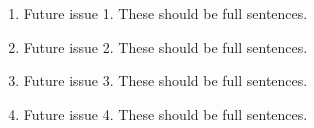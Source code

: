\documentclass{ar-1col}
\begin{document}
\begin{issues}
  \begin{enumerate}
  \item Future issue 1. These should be full sentences.
  \item Future issue 2. These should be full sentences.
  \item Future issue 3. These should be full sentences.
  \item Future issue 4. These should be full sentences.
  \end{enumerate}
\end{issues}

\newpage


 

\clearpage



    
\end{document}
